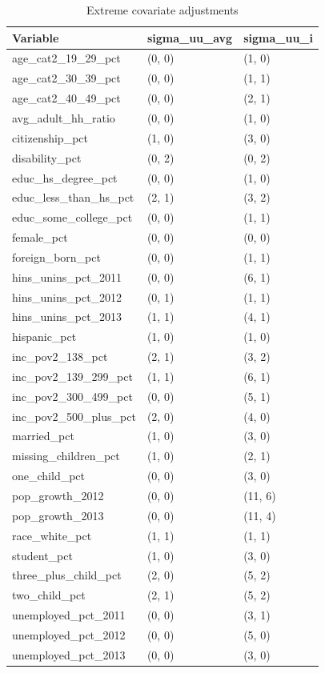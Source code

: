 \documentclass[aoas]{imsart}
\theoremstyle{plain}
\theoremstyle{remark}
\begin{document}
\begin{appendix}
\begin{table}[ht]
\centering
    \caption{Extreme covariate adjustments}
    \label{tab:extreme1}
\begin{tabular}{lll}
  \hline
Variable & sigma\_uu\_avg & sigma\_uu\_i \\ 
  \hline
age\_cat2\_19\_29\_pct & (0, 0) & (1, 0) \\ 
  age\_cat2\_30\_39\_pct & (0, 0) & (1, 1) \\ 
  age\_cat2\_40\_49\_pct & (0, 0) & (2, 1) \\ 
  avg\_adult\_hh\_ratio & (0, 0) & (1, 0) \\ 
  citizenship\_pct & (1, 0) & (3, 0) \\ 
  disability\_pct & (0, 2) & (0, 2) \\ 
  educ\_hs\_degree\_pct & (0, 0) & (1, 0) \\ 
  educ\_less\_than\_hs\_pct & (2, 1) & (3, 2) \\ 
  educ\_some\_college\_pct & (0, 0) & (1, 1) \\ 
  female\_pct & (0, 0) & (0, 0) \\ 
  foreign\_born\_pct & (0, 0) & (1, 1) \\ 
  hins\_unins\_pct\_2011 & (0, 0) & (6, 1) \\ 
  hins\_unins\_pct\_2012 & (0, 1) & (1, 1) \\ 
  hins\_unins\_pct\_2013 & (1, 1) & (4, 1) \\ 
  hispanic\_pct & (1, 0) & (1, 0) \\ 
  inc\_pov2\_138\_pct & (2, 1) & (3, 2) \\ 
  inc\_pov2\_139\_299\_pct & (1, 1) & (6, 1) \\ 
  inc\_pov2\_300\_499\_pct & (0, 0) & (5, 1) \\ 
  inc\_pov2\_500\_plus\_pct & (2, 0) & (4, 0) \\ 
  married\_pct & (1, 0) & (3, 0) \\ 
  missing\_children\_pct & (1, 0) & (2, 1) \\ 
  one\_child\_pct & (0, 0) & (3, 0) \\ 
  pop\_growth\_2012 & (0, 0) & (11, 6) \\ 
  pop\_growth\_2013 & (0, 0) & (11, 4) \\ 
  race\_white\_pct & (1, 1) & (1, 1) \\ 
  student\_pct & (1, 0) & (3, 0) \\ 
  three\_plus\_child\_pct & (2, 0) & (5, 2) \\ 
  two\_child\_pct & (2, 1) & (5, 2) \\ 
  unemployed\_pct\_2011 & (0, 0) & (3, 1) \\ 
  unemployed\_pct\_2012 & (0, 0) & (5, 0) \\ 
  unemployed\_pct\_2013 & (0, 0) & (3, 0) \\ 
   \hline
\end{tabular}
\end{table}


\end{appendix}
\end{document}
